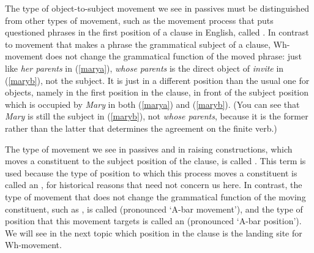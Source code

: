 \documentclass{article}
\begin{document}
The type of object-to-subject movement we see in passives must be distinguished from other types of movement, such as the movement process that puts questioned phrases in the first position of a clause in English, called .
In contrast to movement that makes a phrase the grammatical subject of a clause, Wh-movement does not change the grammatical function of the moved phrase: just like \emph{her parents} in (\ref{marya}), \emph{whose parents} is the direct object of \emph{invite} in (\ref{maryb}), not the subject.
It is just in a different position than the usual one for objects, namely in the first position in the clause, in front of the subject position which is occupied by \emph{Mary} in both (\ref{marya}) and (\ref{maryb}).
(You can see that \emph{Mary} is still the subject in (\ref{maryb}), not \emph{whose parents}, because it is the former rather than the latter that determines the agreement on the finite verb.)
\begin{exe}
\end{exe}
The type of movement we see in passives and in raising constructions, which moves a constituent to the subject position of the clause, is called .
This term is used because the type of position to which this process moves a constituent is called an , for historical reasons that need not concern us here.
In contrast, the type of movement that does not change the grammatical function of the moving constituent, such as , is called  (pronounced `A-bar movement'), and the type of position that this movement targets is called an  (pronounced `A-bar position').
We will see in the next topic which position in the clause is the landing site for Wh-movement.
\end{document}
